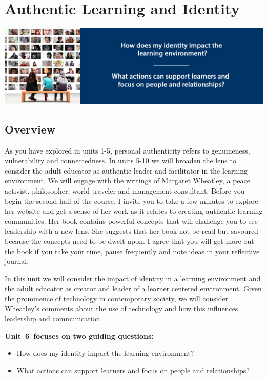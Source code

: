 \documentclass[
]{book}
\providecommand{\tightlist}{%
  \setlength{\itemsep}{0pt}\setlength{\parskip}{0pt}}
\begin{document}
\hypertarget{authentic-learning-and-identity}{%
\chapter{Authentic Learning and Identity}\label{authentic-learning-and-identity}}

\includegraphics{assets/unit6/LDRS664-BannerUnit6.jpg}

\hypertarget{overview-5}{%
\section*{Overview}\label{overview-5}}

As you have explored in units 1-5, personal authenticity refers to genuineness, vulnerability and connectedness. In units 5-10 we will broaden the lens to consider the adult educator as authentic leader and facilitator in the learning environment. We will engage with the writings of \href{http://margaretwheatley.com/home/}{Margaret Wheatley}, a peace activist, philosopher, world traveler and management consultant. Before you begin the second half of the course, I invite you to take a few minutes to explore her website and get a sense of her work as it relates to creating authentic learning communities. Her book contains powerful concepts that will challenge you to see leadership with a new lens. She suggests that her book not be read but savoured because the concepts need to be dwelt upon. I agree that you will get more out the book if you take your time, pause frequently and note ideas in your reflective journal.

In this unit we will consider the impact of identity in a learning environment and the adult educator as creator and leader of a learner centered environment. Given the prominence of technology in contemporary society, we will consider Wheatley's comments about the use of technology and how this influences leadership and communication.

\textbf{Unit~6~focuses on two guiding questions:}

\begin{itemize}
\tightlist
\item
  How does my identity impact the learning environment?\\
\item
  What actions can support learners and focus on people and relationships?
\end{itemize}
\end{document}
